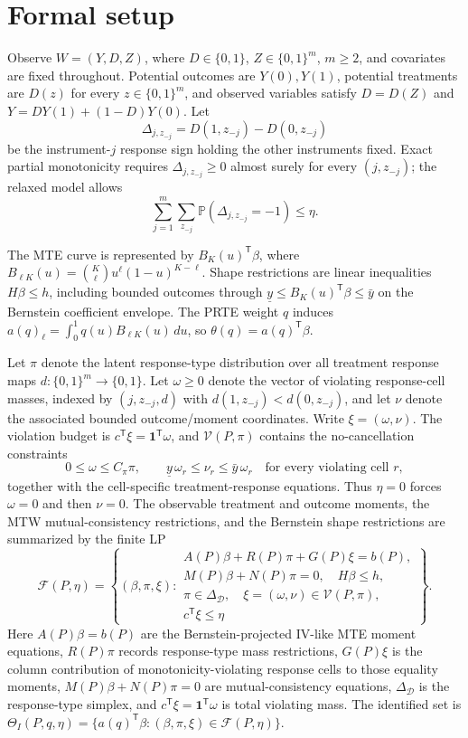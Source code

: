 \documentclass[11pt]{article}
\renewcommand{\Pr}{\mathbb{P}}
\newcommand{\transpose}{\mathsf{T}}
\theoremstyle{definition}
\theoremstyle{plain}
\theoremstyle{remark}
\begin{document}
\section{Formal setup}
Observe \(W=(Y,D,Z)\), where \(D\in\{0,1\}\), \(Z\in\{0,1\}^m\), \(m\ge2\), and covariates are fixed throughout.  Potential outcomes are \(Y(0),Y(1)\), potential treatments are \(D(z)\) for every \(z\in\{0,1\}^m\), and observed variables satisfy \(D=D(Z)\) and \(Y=DY(1)+(1-D)Y(0)\).  Let
\[
\Delta_{j,z_{-j}}=D(1,z_{-j})-D(0,z_{-j})
\]
be the instrument-\(j\) response sign holding the other instruments fixed.  Exact partial monotonicity requires \(\Delta_{j,z_{-j}}\ge0\) almost surely for every \((j,z_{-j})\); the relaxed model allows
\[
\sum_{j=1}^m\sum_{z_{-j}}\Pr(\Delta_{j,z_{-j}}=-1)\le \eta.
\]

The MTE curve is represented by \(B_K(u)^\transpose\beta\), where \(B_{\ell K}(u)=\binom K\ell u^\ell(1-u)^{K-\ell}\).  Shape restrictions are linear inequalities \(H\beta\le h\), including bounded outcomes through \(\underline y\le B_K(u)^\transpose\beta\le \bar y\) on the Bernstein coefficient envelope.  The PRTE weight \(q\) induces \(a(q)_\ell=\int_0^1 q(u)B_{\ell K}(u)\,du\), so \(\theta(q)=a(q)^\transpose\beta\).

Let \(\pi\) denote the latent response-type distribution over all treatment response maps \(d:\{0,1\}^m\to\{0,1\}\).  Let \(\omega\ge0\) denote the vector of violating response-cell masses, indexed by \((j,z_{-j},d)\) with \(d(1,z_{-j})<d(0,z_{-j})\), and let \(\nu\) denote the associated bounded outcome/moment coordinates.  Write \(\xi=(\omega,\nu)\).  The violation budget is \(c^\transpose\xi=\mathbf 1^\transpose\omega\), and \(\mathcal V(P,\pi)\) contains the no-cancellation constraints
\[
0\le \omega\le C_\pi\pi,\qquad \underline y\,\omega_r\le \nu_r\le \bar y\,\omega_r\quad\text{for every violating cell }r,
\]
together with the cell-specific treatment-response equations.  Thus \(\eta=0\) forces \(\omega=0\) and then \(\nu=0\).  The observable treatment and outcome moments, the MTW mutual-consistency restrictions, and the Bernstein shape restrictions are summarized by the finite LP
\[
\mathcal F(P,\eta)=\left\{(\beta,\pi,\xi):
\begin{array}{l}
A(P)\beta+R(P)\pi+G(P)\xi=b(P),\\
M(P)\beta+N(P)\pi=0,\quad H\beta\le h,\\
\pi\in\Delta_{\mathcal D},\quad \xi=(\omega,\nu)\in\mathcal V(P,\pi),\\
c^\transpose \xi\le \eta
\end{array}\right\}.
\]
Here \(A(P)\beta=b(P)\) are the Bernstein-projected IV-like MTE moment equations, \(R(P)\pi\) records response-type mass restrictions, \(G(P)\xi\) is the column contribution of monotonicity-violating response cells to those equality moments, \(M(P)\beta+N(P)\pi=0\) are mutual-consistency equations, \(\Delta_{\mathcal D}\) is the response-type simplex, and \(c^\transpose\xi=\mathbf 1^\transpose\omega\) is total violating mass.  The identified set is \(\Theta_I(P,q,\eta)=\{a(q)^\transpose\beta:(\beta,\pi,\xi)\in\mathcal F(P,\eta)\}\).
\end{document}
